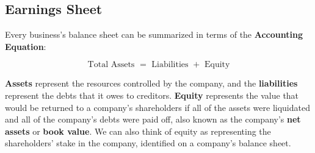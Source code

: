 \documentclass{article}
\begin{document}
  \subsection{Earnings Sheet}

    Every business's balance sheet can be summarized in terms of the \textbf{Accounting Equation}:

    \begin{equation}
      \text{Total Assets } = \text{ Liabilities } + \text{ Equity}
    \end{equation}

    \textbf{Assets} represent the resources controlled by the company, and the \textbf{liabilities} represent the debts that it owes to creditors. \textbf{Equity} represents the value that would be returned to a company's shareholders if all of the assets were liquidated and all of the company's debts were paid off, also known as the company's \textbf{net assets} or \textbf{book value}. We can also think of equity as representing the shareholders' stake in the company, identified on a company's balance sheet.
\end{document}
